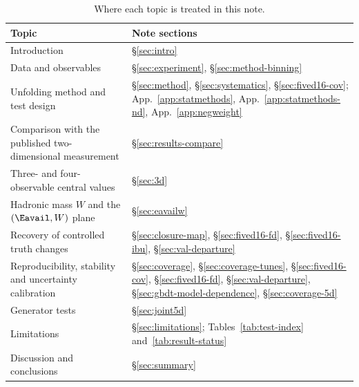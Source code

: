 \begin{table}[H]
\centering\small
\caption{Where each topic is treated in this note.}
\label{tab:paper-note-map}
\begin{tabular}{@{}p{}p{}@{}}
\toprule
Topic & Note sections \\
\midrule
Introduction & \S\ref{sec:intro} \\
Data and observables & \S\ref{sec:experiment}, \S\ref{sec:method-binning} \\
Unfolding method and test design & \S\ref{sec:method}, \S\ref{sec:systematics}, \S\ref{sec:fived16-cov}; App.~\ref{app:statmethods}, App.~\ref{app:statmethods-nd}, App.~\ref{app:negweight} \\
Comparison with the published two-dimensional measurement & \S\ref{sec:results-compare} \\
Three- and four-observable central values & \S\ref{sec:3d} \\
Hadronic mass $W$ and the $(\Eavail,W)$ plane & \S\ref{sec:eavailw} \\
Recovery of controlled truth changes & \S\ref{sec:closure-map}, \S\ref{sec:fived16-fd}, \S\ref{sec:fived16-ibu}, \S\ref{sec:val-departure} \\
Reproducibility, stability and uncertainty calibration & \S\ref{sec:coverage}, \S\ref{sec:coverage-tunes}, \S\ref{sec:fived16-cov}, \S\ref{sec:fived16-fd}, \S\ref{sec:val-departure}, \S\ref{sec:gbdt-model-dependence}, \S\ref{sec:coverage-5d} \\
Generator tests & \S\ref{sec:joint5d} \\
Limitations & \S\ref{sec:limitations}; Tables~\ref{tab:test-index} and~\ref{tab:result-status} \\
Discussion and conclusions & \S\ref{sec:summary} \\
\bottomrule
\end{tabular}
\end{table}

